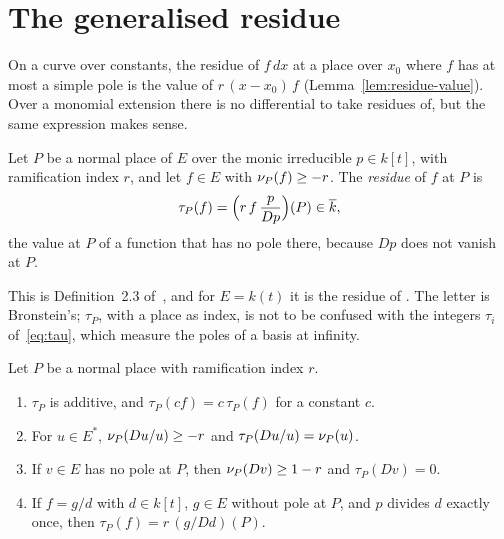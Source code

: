 \section{The generalised residue}\label{sec:mono-residue}

On a curve over constants, the residue of $f\,dx$ at a place over $x_0$ where
$f$ has at most a simple pole is the value of $r\,(x - x_0)\,f$
(Lemma~\ref{lem:residue-value}). Over a monomial extension there is no
differential to take residues of, but the same expression makes sense.

\begin{definition}\label{def:tau}
Let $P$ be a normal place of $E$ over the monic irreducible $p \in k[t]$,
with ramification index $r$, and let $f \in E$ with $\nu_{P}(f) \ge -r$. The
\emph{residue} of $f$ at $P$ is
\[
  \tau_P(f) = \Bigl( r\, f\, \frac{p}{Dp} \Bigr)(P) \in \overline{k} ,
\]
the value at $P$ of a function that has no pole there, because $Dp$ does not
vanish at $P$.
\end{definition}

This is Definition~2.3 of~\cite{bronstein1990}, and for $E = k(t)$ it is the
residue of . The letter is Bronstein's; $\tau_P$, with a
place as index, is not to be confused with the integers $\tau_i$
of~\eqref{eq:tau}, which measure the poles of a basis at infinity.

\begin{theorem}\label{thm:tau}
Let $P$ be a normal place with ramification index $r$.
\begin{enumerate}[label=\textup{(\roman*)}]
\item $\tau_P$ is additive, and $\tau_P(c f) = c\, \tau_P(f)$ for a constant
  $c$.
\item For $u \in E^*$, $\nu_{P}(Du/u) \ge -r$ and $\tau_P(Du/u) = \nu_{P}(u)$.
\item If $v \in E$ has no pole at $P$, then $\nu_{P}(Dv) \ge 1 - r$ and
  $\tau_P(Dv) = 0$.
\item If $f = g/d$ with $d \in k[t]$, $g \in E$ without pole at $P$, and $p$
  divides $d$ exactly once, then $\tau_P(f) = r\,(g/Dd)(P)$.
\end{enumerate}
\end{theorem}

